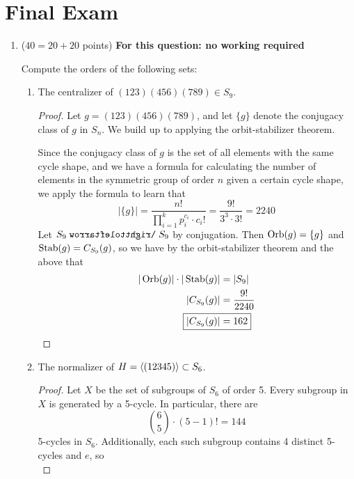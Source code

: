 \documentclass[../psets.tex]{subfiles}
\begin{document}
\section{Final Exam}
\begin{enumerate}
    \item {}($40=20+20$ points) \textbf{For this question: no working required}\par
    Compute the orders of the following sets:
    \begin{enumerate}
        \item The centralizer of $(123)(456)(789)\in S_9$.
        \begin{proof}
            Let $g=(123)(456)(789)$, and let $\{g\}$ denote the conjugacy class of $g$ in $S_n$. We build up to applying the orbit-stabilizer theorem.\par
            Since the conjugacy class of $g$ is the set of all elements with the same cycle shape, and we have a formula for calculating the number of elements in the symmetric group of order $n$ given a certain cycle shape, we apply the formula to learn that
            \begin{equation*}
                |\{g\}| = \frac{n!}{\prod_{i=1}^kp_i^{c_i}\cdot c_i!}
                = \frac{9!}{3^3\cdot 3!}
                = 2240
            \end{equation*}
            Let $S_9\acts S_9$ by conjugation. Then $\operatorname{Orb}(g)=\{g\}$ and $\operatorname{Stab}(g)=C_{S_9}(g)$, so we have by the orbit-stabilizer theorem and the above that
            \begin{align*}
                |\Orb(g)|\cdot|\Stab(g)| &= |S_9|\\
                |C_{S_9}(g)| &= \frac{9!}{2240}\\
                \Aboxed{|C_{S_9}(g)| &= 162}
            \end{align*}
        \end{proof}
        \item The normalizer of $H=\left\langle{(12345)}\right\rangle\subset S_6$.
        \begin{proof}
            Let $X$ be the set of subgroups of $S_6$ of order 5. Every subgroup in $X$ is generated by a 5-cycle. In particular, there are
            \begin{equation*}
                \binom{6}{5}\cdot(5-1)! = 144
            \end{equation*}
            5-cycles in $S_6$. Additionally, each such subgroup contains 4 distinct 5-cycles and $e$, so
            \begin{equation*}

\end{equation*}
\end{proof}
\end{enumerate}
\end{enumerate}
\end{document}
